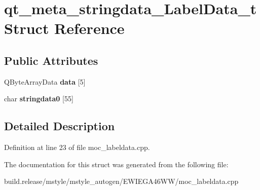 \hypertarget{structqt__meta__stringdata___label_data__t}{}\section{qt\+\_\+meta\+\_\+stringdata\+\_\+\+Label\+Data\+\_\+t Struct Reference}
\label{structqt__meta__stringdata___label_data__t}
\subsection*{Public Attributes}
\begin{DoxyCompactItemize}
\item 
\mbox{\label{structqt__meta__stringdata___label_data__t_af0cd9c87515ab5f1deee1c574b73819b}} 
Q\+Byte\+Array\+Data {\bfseries data} \mbox{[}5\mbox{]}
\item 
\mbox{\label{structqt__meta__stringdata___label_data__t_a0aabeb13e624fdf2db3b5c46cd696164}} 
char {\bfseries stringdata0} \mbox{[}55\mbox{]}
\end{DoxyCompactItemize}


\subsection{Detailed Description}


Definition at line 23 of file moc\+\_\+labeldata.\+cpp.



The documentation for this struct was generated from the following file\+:\begin{DoxyCompactItemize}
\item 
build.\+release/mstyle/mstyle\+\_\+autogen/\+E\+W\+I\+E\+G\+A46\+W\+W/moc\+\_\+labeldata.\+cpp\end{DoxyCompactItemize}
